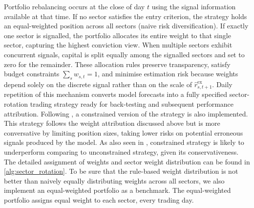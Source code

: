 Portfolio rebalancing occurs at the close of day $t$ using the signal information available at that time.  If no sector satisfies the entry criterion, the strategy holds an equal-weighted position across all sectors (naive risk diversification).  If exactly one sector is signalled, the portfolio allocates its entire weight to that single sector, capturing the highest conviction view.  When multiple sectors exhibit concurrent signals, capital is split equally among the signalled sectors and set to zero for the remainder. These allocation rules preserve transparency, satisfy budget constraints $\sum_{s}w_{s,t}=1$, and minimise estimation risk because weights depend solely on the discrete signal rather than on the scale of $\widehat{r}^{\text{ex}}_{s,t+1}$.  Daily repetition of this mechanism converts model forecasts into a fully specified sector-rotation trading strategy ready for back-testing and subsequent performance attribution. Following , a constrained version of the strategy is also implemented. This strategy follows the weight attribution discussed above but is more conversative by limiting position sizes, taking lower risks on potential erroneous signals produced by the model. As also seen in , constrained strategy is likely to underperform comparing to unconstrained strategy, given its conservativeness. The detailed assignment of weights and sector weight distribution can be found in \cref{alg:sector_rotation}. To be sure that the rule-based weight distribution is not better than naively equally distributing weights across all sectors, we also implement an equal-weighted portfolio as a benchmark. The equal-weighted portfolio assigns equal weight to each sector, every trading day. 

